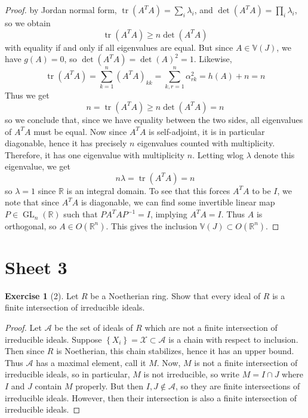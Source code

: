 \documentclass[reqno]{amsart}
\theoremstyle{definition}
\newtheorem{exercise}[theorem]{Exercise}
\theoremstyle{remark}
\DeclareMathOperator{\GL}{GL}
\DeclareMathOperator{\tr}{tr}
\begin{document}
\begin{proof}
        by Jordan normal form,
        $\tr \left( A^{T}A \right) =
        \sum_{i} \lambda_i$, and
        $\det \left( A^{T}A \right) =
        \prod_i \lambda_i$, so we obtain
        \[
        \tr(A^{T}A) \ge n \det \left( A^{T}A \right) 
        \] 
        with equality if and only if all eigenvalues are equal.
        But since $A \in \mathbb{V} (J)$, we have
        $g (A) = 0$, so
        $\det \left( A^{T}A \right) 
        = \det (A)^2 = 1$. Likewise,
        \[
        \tr \left( A^{T}A \right) 
        = \sum_{k=1}^{n} \left( A^{T}A \right)_{kk} 
        = \sum_{k,r=1}^{n} \alpha_{rk}^2
        = h(A)+n = n
        \] 
        Thus we get
        \[
        n = \tr\left( A^{T}A \right) \ge 
        n \det \left( A^{T}A \right) = n
        \] 
        so we conclude that, since we have equality between
        the two sides, all eigenvalues of
        $A^{T}A$ must be equal.
        Now since
        $A^{T}A$ is self-adjoint, it is in particular
        diagonable, hence it has
        precisely $n$ eigenvalues counted with multiplicity.
        Therefore, it has one eigenvalue with multiplicity $n$.
        Letting wlog $\lambda$ denote this eigenvalue, we
        get
        \[
        n \lambda = \tr \left( A^{T}A \right) 
        = n
        \] 
        so $\lambda = 1$ since $\mathbb{R}$ is an integral
        domain.
        To see that this forces $A^{T}A$ to be $I$, 
        we note that since $A^{T}A$ is diagonable, we can
        find some invertible linear map
        $P \in \GL_n \left( \mathbb{R} \right) $ such that
        $P A^{T}A P^{-1} = I$, implying
        $A^{T}A = I$. Thus $A$ is orthogonal, so
        $A \in O \left( \mathbb{R}^{n} \right) $.
        This gives the inclusion
        $\mathbb{V} (J) \subset O \left( \mathbb{R}^{n} \right) $.
    \end{proof}


\section{Sheet 3}

\begin{exercise}[2]
    Let $R$ be a Noetherian ring. Show that every ideal of
    $R$ is a finite intersection of
    irreducible ideals.
\end{exercise}

\begin{proof}
    Let
    $\mathcal{A}$ be the set of ideals
    of $R$ which are not a finite intersection of
    irreducible ideals.
    Suppose
    $\left\{ X_i \right\}
    = \mathcal{X} \subset \mathcal{A}$ is a chain with
    respect to inclusion.
    Then since $R$ is Noetherian, this chain stabilizes, hence
    it has an upper bound. Thus
    $\mathcal{A}$ has a maximal element, call it
    $M$. Now, $M$ is not a finite intersection
    of irreducible ideals, so in particular,
    $M$ is not irreducible, so write
    $M = I \cap J$ where
    $I$ and $J$ contain $M$ properly. But then
    $I,J \not\in \mathcal{A}$, so
    they are finite intersections of irreducible ideals.
    However, then
    their intersection is also a finite intersection of
    irreducible ideals.
\end{proof}
\end{document}
